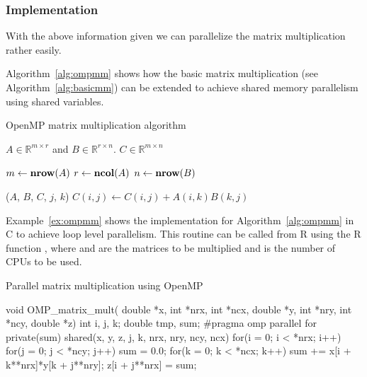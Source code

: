 \subsubsection{Implementation}

With the above information given we can parallelize the matrix
multiplication rather easily.

Algorithm~\ref{alg:ompmm} shows how the basic matrix multiplication
(see Algorithm~\ref{alg:basicmm}) can be extended to achieve shared
memory parallelism using shared variables. 

\begin{algorithm}
\caption{OpenMP matrix multiplication algorithm}
\label{alg:ompmm}
\begin{algorithmic}[1]

  \REQUIRE $A \in \mathbb{R}^{m \times r}$ and $B \in \mathbb{R}^{r
    \times n}$.
  \ENSURE $C \in \mathbb{R}^{m \times n}$

  \STATE $m \leftarrow \textbf{nrow} (A)$
  \STATE $r \leftarrow \textbf{ncol} (A)$
  \STATE $n \leftarrow \textbf{nrow} (B)$

  \STATE \OMPFOR \OMPSHARE($A$, $B$, $C$, $j$, $k$)
         \STATE $C(i,j) \leftarrow C(i,j) + A(i,k)B(k,j)$
       \ENDFOR
    \ENDFOR
  \ENDFOR

\end{algorithmic}
\end{algorithm}

Example~\ref{ex:ompmm} shows the implementation for
Algorithm~\ref{alg:ompmm} in C to achieve loop level parallelism. This
routine can be called from R
using the R function , where  and
 are the matrices to be multiplied and  is the
number of CPUs to be used.
\newpage
\begin{Example} Parallel matrix multiplication using OpenMP
\label{ex:ompmm}
\begin{Scode}

void OMP_matrix_mult( double *x, int *nrx, int *ncx,
		      double *y, int *nry, int *ncy,
		      double *z) {
  int i, j, k;
  double tmp, sum;
  #pragma omp parallel for private(sum) shared(x, y, z, j, k, nrx,
                                             nry, ncy, ncx)
  for(i = 0; i < *nrx; i++)
    for(j = 0; j < *ncy; j++){
      sum = 0.0;
      for(k = 0; k < *ncx; k++) 
	sum += x[i + k**nrx]*y[k + j**nry];
      z[i + j**nrx] = sum;
    }
}
\end{Scode}
\end{Example}


